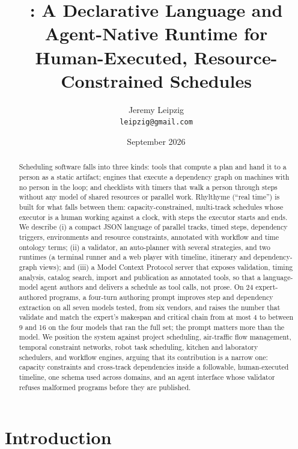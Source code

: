 \documentclass[10pt]{article}
\title{\rt{}: A Declarative Language and Agent-Native Runtime for\\Human-Executed, Resource-Constrained Schedules}
\author{Jeremy Leipzig\\\texttt{leipzig@gmail.com}}
\date{September 2026}
\newcommand{\rt}{Rhylthyme}
\begin{document}
\maketitle

\begin{abstract}
Scheduling software falls into three kinds: tools that compute a plan and hand it to a person as a static artifact; engines that execute a dependency graph on machines with no person in the loop; and checklists with timers that walk a person through steps without any model of shared resources or parallel work. \rt{} (``real time'') is built for what falls between them: capacity-constrained, multi-track schedules whose executor is a human working against a clock, with steps the executor starts and ends. We describe (i) a compact JSON language of parallel tracks, timed steps, dependency triggers, environments and resource constraints, annotated with workflow and time ontology terms; (ii) a validator, an auto-planner with several strategies, and two runtimes (a terminal runner and a web player with timeline, itinerary and dependency-graph views); and (iii) a Model Context Protocol server that exposes validation, timing analysis, catalog search, import and publication as annotated tools, so that a language-model agent authors and delivers a schedule as tool calls, not prose. On 24 expert-authored programs, a four-turn authoring prompt improves step and dependency extraction on all seven models tested, from six vendors, and raises the number that validate and match the expert's makespan and critical chain from at most 4 to between 9 and 16 on the four models that ran the full set; the prompt matters more than the model. We position the system against project scheduling, air-traffic flow management, temporal constraint networks, robot task scheduling, kitchen and laboratory schedulers, and workflow engines, arguing that its contribution is a narrow one: capacity constraints and cross-track dependencies inside a followable, human-executed timeline, one schema used across domains, and an agent interface whose validator refuses malformed programs before they are published.
\end{abstract}

\section{Introduction}
\end{document}
